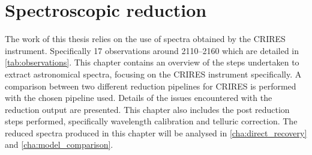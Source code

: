 
\chapter{Spectroscopic reduction} %
\label{cha:reduction}

The work of this thesis relies on the use of \nir{} spectra obtained by the {CRIRES} instrument.
Specifically 17 observations around 2110--2160\nm{} which are detailed in \cref{tab:observations}.
This chapter contains an overview of the steps undertaken to extract astronomical spectra, focusing on the {CRIRES} instrument specifically.
A comparison between two different reduction pipelines for {CRIRES} is performed with the chosen pipeline used.
Details of the issues encountered with the reduction output are presented.
This chapter also includes the post reduction steps performed, specifically wavelength calibration and telluric correction.
The reduced spectra produced in this chapter will be analysed in \cref{cha:direct_recovery} and \cref{cha:model_comparison}.


